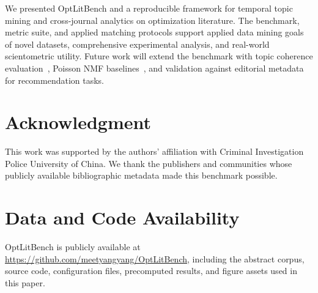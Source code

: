 \documentclass[conference]{IEEEtran}
\newcommand{\repo}{\url{https://github.com/meetyangyang/OptLitBench}}
\begin{document}
We presented OptLitBench and a reproducible framework for temporal topic mining and cross-journal analytics on optimization literature.
The benchmark, metric suite, and applied matching protocols support applied data mining goals of novel datasets, comprehensive experimental analysis, and real-world scientometric utility.
Future work will extend the benchmark with topic coherence evaluation~\cite{roder2015coherence}, Poisson NMF baselines~\cite{willis2021poisson}, and validation against editorial metadata for recommendation tasks.

\section*{Acknowledgment}
This work was supported by the authors' affiliation with Criminal Investigation Police University of China.
We thank the publishers and communities whose publicly available bibliographic metadata made this benchmark possible.

\section*{Data and Code Availability}
OptLitBench is publicly available at \repo{}, including the abstract corpus, source code, configuration files, precomputed results, and figure assets used in this paper.



\end{document}

